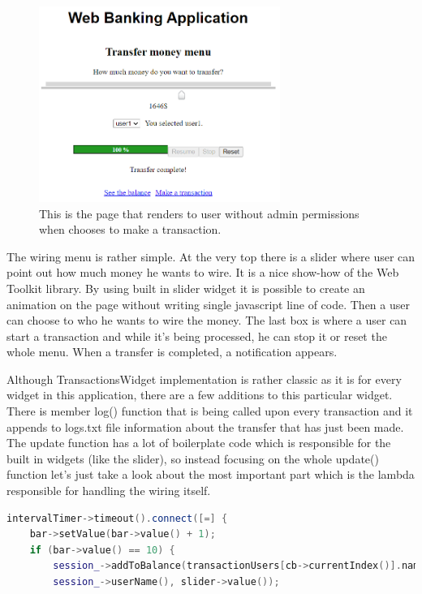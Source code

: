 \documentclass[a4paper,12pt]{book}
\begin{document}
{{\begin{figure}[H]
\centering
\includegraphics[width=0.7\textwidth]{wire}
\caption{This is the page that renders to user without admin permissions when chooses to make a transaction.}
\end{figure}

The wiring menu is rather simple. At the very top there is a slider where user can point out how much money he wants to wire. It is a nice show-how of the Web Toolkit library. By using built in slider widget it is possible to create an animation on the page without writing single javascript line of code. Then a user can choose to who he wants to wire the money. The last box is where a user can start a transaction and while it's being processed, he can stop it or reset the whole menu. When a transfer is completed, a notification appears.

\bigskip 
Although TransactionsWidget implementation is rather classic as it is for every widget in this application, there are a few additions to this particular widget. There is member log() function that is being called upon every transaction and it appends to logs.txt file information about the transfer that has just been made. The update function has a lot of boilerplate code which is responsible for the built in widgets (like the slider), so instead focusing on the whole update() function let's just take a look about the most important part which is the lambda responsible for handling the wiring itself.

\bigskip
\begin{lstlisting}[frame=single, basicstyle=\small, language=C++, caption={Part of TransactionWidget::update() function.}, captionpos=b]
intervalTimer->timeout().connect([=] {
	bar->setValue(bar->value() + 1);
	if (bar->value() == 10) {
		session_->addToBalance(transactionUsers[cb->currentIndex()].name,
		session_->userName(), slider->value());
		

\end{lstlisting}}}
\end{document}
